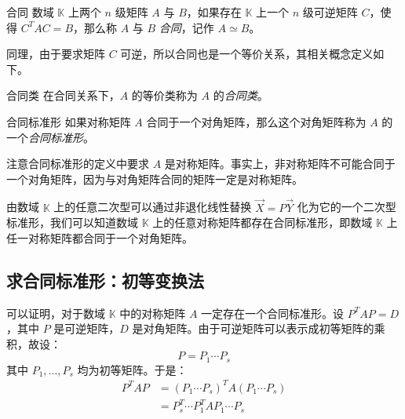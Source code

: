 \begin{definition}{合同}
	数域 $\mathbb K$ 上两个 $n$ 级矩阵 $A$ 与 $B$，如果存在 $\mathbb K$ 上一个 $n$ 级可逆矩阵 $C$，使得 $C^T AC = B$，那么称 $A$ 与 $B$ \emph{合同}，记作 $A \simeq B$。
\end{definition}

同理，由于要求矩阵 $C$ 可逆，所以合同也是一个等价关系，其相关概念定义如下。

\begin{definition}{合同类}
	在合同关系下，$A$ 的等价类称为 $A$ 的\emph{合同类}。
\end{definition}

\begin{definition}{合同标准形}
	如果对称矩阵 $A$ 合同于一个对角矩阵，那么这个对角矩阵称为 $A$ 的一个\emph{合同标准形}。
\end{definition}

注意合同标准形的定义中要求 $A$ 是对称矩阵。事实上，非对称矩阵不可能合同于一个对角矩阵，因为与对角矩阵合同的矩阵一定是对称矩阵。

由数域 $\mathbb K$ 上的任意二次型可以通过非退化线性替换 $\vec X = P \vec Y$ 化为它的一个二次型标准形，我们可以知道数域 $\mathbb K$ 上的任意对称矩阵都存在合同标准形，即数域 $\mathbb K$ 上任一对称矩阵都合同于一个对角矩阵。

\subsection{求合同标准形：初等变换法}

可以证明，对于数域 $\mathbb K$ 中的对称矩阵 $A$ 一定存在一个合同标准形。设 $P^T A P = D$，其中 $P$ 是可逆矩阵，$D$ 是对角矩阵。由于可逆矩阵可以表示成初等矩阵的乘积，故设：
$$
P = P_1 \cdots P_s
$$
其中 $P_1, \ldots, P_s$ 均为初等矩阵。于是：
$$
\begin{aligned}
	P^T A P &= (P_1 \cdots P_s)^T A (P_1 \cdots P_s)
	\\&=
	P_s^T \cdots P_1^T A P_1 \cdots P_s
\end{aligned}
$$

